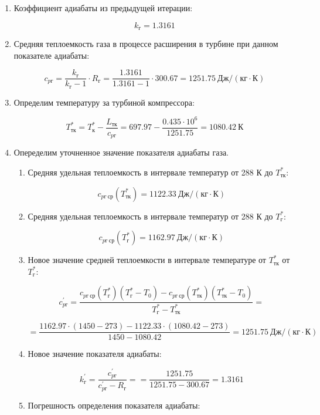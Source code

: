 \documentclass[a4paper,10pt]{article}
\begin{document}
\begin{enumerate}
	\item Коэффициент адиабаты из предыдущей итерации:
	
	\[
	k_г = 1.3161
	\]
	
	\item Средняя теплоемкость газа в процессе расширения в турбине при данном показателе адиабаты:
	
	\[
	c_{pг} = \frac{ k_г }{ k_г - 1 } \cdot R_г = 
			\frac{ 1.3161 }{ 1.3161 - 1 } \cdot 300.67 = 
			1251.75\ Дж / (кг \cdot К)
	\]
	
	\item Определим температуру за турбиной компрессора:
	
	\[
	T_{тк}^* = T_к^* - \frac{ L_{тк} }{ c_{pг} } = 
			697.97 - \frac{ 0.435 \cdot 10^6  }{ 1251.75 } = 
			1080.42\ К
	\]
	
	\item Опеределим уточненное значение показателя адиабаты газа.
	
	\begin{enumerate}
	
		\item Средняя удельная теплоемкость в интервале температур от 288 К до $ T_{тк}^* $:
		
		\[
		c_{pг\ ср} (T_{тк}^*) = 1122.33\ Дж / (кг \cdot К)
		\]
		
		\item Средняя удельная теплоемкость в интервале температур от 288 К до $ T_{г}^* $:
		
		\[
		c_{pг\ ср} (T_{г}^*) = 1162.97\ Дж / (кг \cdot К)
		\]
		
		\item Новое значение средней теплоемкости в интервале температуре от $ T_{тк}^* $ от $ T_{г}^* $:
		
		\[c_{pг}^\prime = \frac{
		c_{pг\ ср}(T_г^*) (T_г^* - T_0) - c_{pг\ ср}(T_{тк}^*) (T_{тк}^* - T_0)
		}{
		T_г^* - T_{тк}^*} = \]
		
		\[ =\frac{
		1162.97 \cdot (1450 - 273) - 
		1122.33 \cdot (1080.42 - 273)
		}{
		1450 - 1080.42} = 
		1251.75 \ Дж / (кг \cdot К)
		\]
		
		\item Новое значение показателя адиабаты:
		
		\[
		k_{г}^\prime = \frac{ c_{pг}^\prime }{ c_{pг}^\prime - R_г } = 
				= \frac{ 1251.75 }{ 1251.75 - 300.67 } =
				1.3161
		\]
		
		\item Погрешность определения показателя адиабаты:
		

\end{enumerate}
\end{enumerate}
\end{document}
